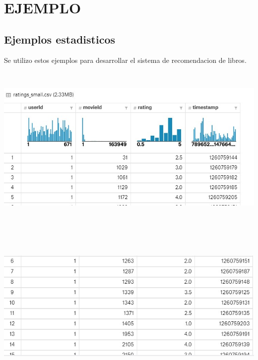 \section{EJEMPLO} 



\subsection{Ejemplos estadisticos}
	
Se utilizo estos ejemplos para desarrollar el sistema de recomendacion de libros.


\begin{center}
\includegraphics[width=18cm, height=8cm]{./Imagenes/img1.jpg}
\end{center}


\begin{center}
\includegraphics[width=18cm, height=8cm]{./Imagenes/img2.jpg}
\end{center}


